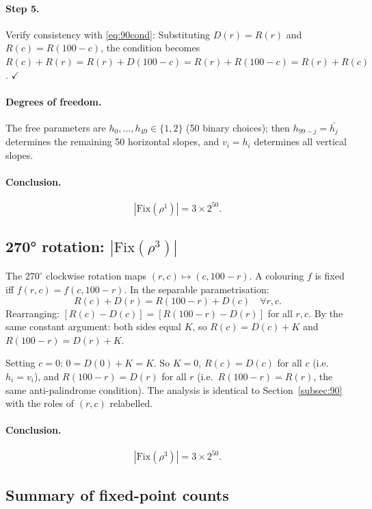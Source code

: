 \documentclass{article}
\newcommand{\Fix}{\mathrm{Fix}}
\newcommand{\comp}[1]{\bar{#1}}   %
\begin{document}
\paragraph{Step 5.} Verify consistency with
\eqref{eq:90cond}: Substituting $D(r)=R(r)$ and
$R(c) = R(100-c)$, the condition becomes
$R(c)+R(r) = R(r)+D(100-c) = R(r)+R(100-c) = R(r)+R(c)$.
$\checkmark$

\paragraph{Degrees of freedom.}
The free parameters are $h_0,\ldots,h_{49}\in\{1,2\}$
(50 binary choices); then $h_{99-j}=\comp{h_j}$ determines
the remaining 50 horizontal slopes, and $v_i=h_i$ determines
all vertical slopes.

\paragraph{Conclusion.}
\[
  |\Fix(\rho^1)| = 3\times 2^{50}.
\]

\subsection{270° rotation: $|\Fix(\rho^3)|$}
\label{subsec:270}

The $270^\circ$ clockwise rotation maps
$(r,c)\mapsto(c,100-r)$.  A colouring $f$ is fixed iff
$f(r,c) = f(c,100-r)$.  In the separable parametrisation:
\[
  R(c)+D(r) = R(100-r)+D(c)\quad\forall r,c.
\]
Rearranging: $[R(c)-D(c)] = [R(100-r)-D(r)]$ for all $r,c$.
By the same constant argument: both sides equal $K$, so
$R(c) = D(c)+K$ and $R(100-r) = D(r)+K$.

Setting $c=0$: $0 = D(0)+K = K$.  So $K=0$,
$R(c) = D(c)$ for all $c$ (i.e.\ $h_i = v_i$), and
$R(100-r) = D(r)$ for all $r$ (i.e.\ $R(100-r)=R(r)$,
the same anti-palindrome condition).
The analysis is identical to Section~\ref{subsec:90} with
the roles of $(r,c)$ relabelled.

\paragraph{Conclusion.}
\[
  |\Fix(\rho^3)| = 3\times 2^{50}.
\]

\subsection{Summary of fixed-point counts}
\end{document}
